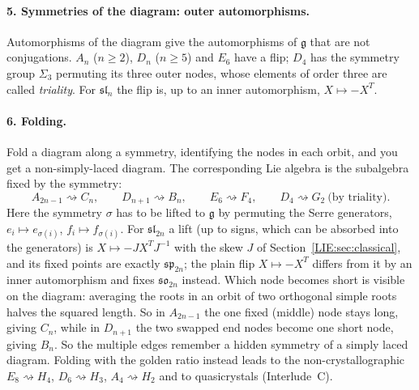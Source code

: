 \paragraph{5. Symmetries of the diagram: outer automorphisms.} Automorphisms of the diagram give the
automorphisms of $\mathfrak g$ that are not conjugations. $A_n$ ($n\ge2$), $D_n$ ($n\ge5$) and $E_6$
have a flip; $D_4$ has the symmetry group $\Sigma_3$ permuting its three outer nodes, whose elements of
order three are called \emph{triality}. For $\mathfrak{sl}_n$ the flip is, up to an inner automorphism,
$X\mapsto-X^T$.

\paragraph{6. Folding.} Fold a diagram along a symmetry, identifying the nodes in each orbit, and you
get a non-simply-laced diagram. The corresponding Lie algebra is the subalgebra fixed by the symmetry:
\[
  A_{2n-1}\rightsquigarrow C_n,\qquad D_{n+1}\rightsquigarrow B_n,\qquad E_6\rightsquigarrow F_4,\qquad
  D_4\rightsquigarrow G_2\ \text{(by triality)}.
\]
Here the symmetry $\sigma$ has to be lifted to $\mathfrak g$ by permuting the Serre generators,
$e_i\mapsto e_{\sigma(i)}$, $f_i\mapsto f_{\sigma(i)}$. For $\mathfrak{sl}_{2n}$ a lift (up to signs, which
can be absorbed into the generators) is $X\mapsto-JX^TJ^{-1}$ with the skew $J$ of
Section~\ref{LIE:sec:classical}, and its fixed points are exactly $\mathfrak{sp}_{2n}$; the plain flip
$X\mapsto-X^T$ differs from it by an inner automorphism and fixes $\mathfrak{so}_{2n}$ instead. Which
node becomes short is visible on the diagram: averaging the roots in an orbit of two orthogonal simple
roots halves the squared length. So in $A_{2n-1}$ the one fixed (middle) node stays long, giving $C_n$,
while in $D_{n+1}$ the two swapped end nodes become one short node, giving $B_n$.
So the multiple edges remember a hidden symmetry of a simply laced diagram. Folding with the golden
ratio instead leads to the non-crystallographic $E_8\rightsquigarrow H_4$, $D_6\rightsquigarrow H_3$,
$A_4\rightsquigarrow H_2$ and to quasicrystals (Interlude~C).


